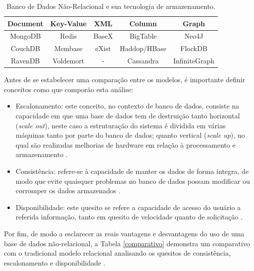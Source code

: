 \begin{table}[!htb]
\centering
\caption{Banco de Dados Não-Relacional e sua tecnologia de armazenamento.}
\begin{tabular}{c|c|c|c|c}
\hline
\textbf{Document} & \textbf{Key-Value} & \textbf{XML} & \textbf{Column} & \textbf{Graph}\\ 
\hline                               
MongoDB & Redis & BaseX & BigTable & Neo4J \\
\hline
CouchDB & Membase & eXist & Haddop/HBase & FlockDB \\
\hline
RavenDB & Voldemort & - & Cassandra & InfiniteGraph \\
\hline

\end{tabular}
\end{table}

Antes de se estabelecer uma comparação entre os modelos, é importante definir conceitos como que comporão esta análise:

\begin{itemize}
\item Escalonamento: este conceito, no contexto de banco de dados, consiste na capacidade em que uma base de dados tem de destruição tanto horizontal (\textit{scale out}), neste caso a estruturação do sistema é dividida em várias máquinas tanto por parte do banco de dados; quanto vertical (\textit{scale up}), no qual são realizadas melhorias de hardware em relação à processamento e armazenamento \cite{toth2011abordagem}.

\item Consistência: refere-se à capacidade de manter os dados de forma íntegra, de modo que evite quaisquer problemas no banco de dados possam modificar ou corromper os dados armazenados \cite{brito2010bancos}.

\item Disponibilidade: este quesito se refere a capacidade de acesso do usuário a referida informação, tanto em quesito de velocidade quanto de solicitação \cite{brito2010bancos}.

\end{itemize}

Por fim, de modo a esclarecer as reais vantagens e desvantagens do uso de uma base de dados não-relacional, a Tabela \ref{comparativo} demonstra um comparativo com o tradicional modelo relacional analisando os quesitos de consistência, escalonamento e disponibilidade \cite{brito2010bancos}.

